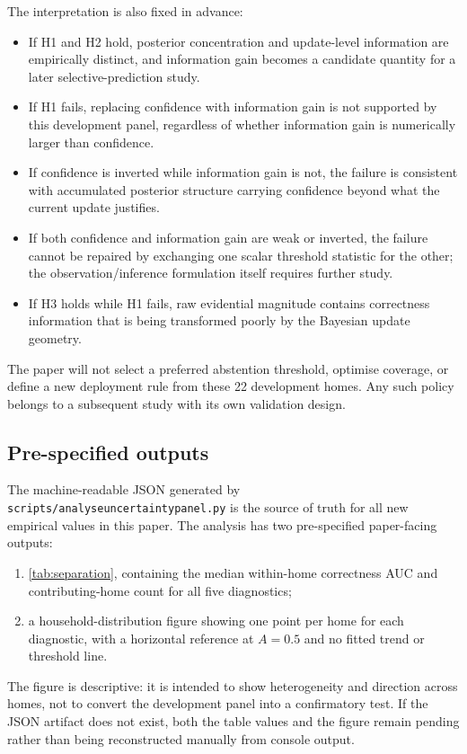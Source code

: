 \documentclass[11pt]{article}
\renewcommand{\_}{\textunderscore\allowbreak}
\begin{document}
The interpretation is also fixed in advance:
\begin{itemize}
    \item If H1 and H2 hold, posterior concentration and update-level information are empirically distinct, and information gain becomes a candidate quantity for a later selective-prediction study.
    \item If H1 fails, replacing confidence with information gain is not supported by this development panel, regardless of whether information gain is numerically larger than confidence.
    \item If confidence is inverted while information gain is not, the failure is consistent with accumulated posterior structure carrying confidence beyond what the current update justifies.
    \item If both confidence and information gain are weak or inverted, the failure cannot be repaired by exchanging one scalar threshold statistic for the other; the observation/inference formulation itself requires further study.
    \item If H3 holds while H1 fails, raw evidential magnitude contains correctness information that is being transformed poorly by the Bayesian update geometry.
\end{itemize}

The paper will not select a preferred abstention threshold, optimise coverage, or define a new deployment rule from these 22 development homes. Any such policy belongs to a subsequent study with its own validation design.

\subsection*{Pre-specified outputs}

The machine-readable JSON generated by \texttt{scripts/analyse\_uncertainty\_panel.py} is the source of truth for all new empirical values in this paper. The analysis has two pre-specified paper-facing outputs:
\begin{enumerate}[label=(\roman*)]
    \item \cref{tab:separation}, containing the median within-home correctness AUC and contributing-home count for all five diagnostics;
    \item a household-distribution figure showing one point per home for each diagnostic, with a horizontal reference at $A=0.5$ and no fitted trend or threshold line.
\end{enumerate}

The figure is descriptive: it is intended to show heterogeneity and direction across homes, not to convert the development panel into a confirmatory test. If the JSON artifact does not exist, both the table values and the figure remain pending rather than being reconstructed manually from console output.
\end{document}
